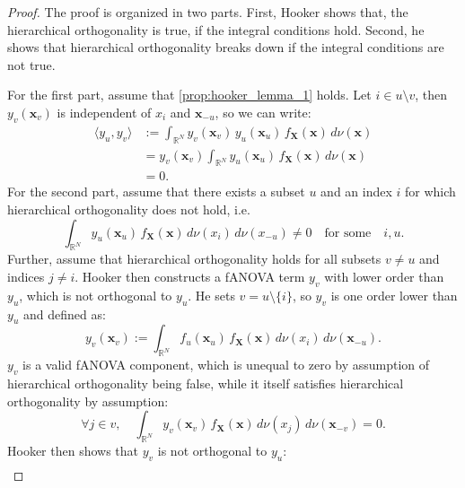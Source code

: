 \begin{proof}
    The proof is organized in two parts. First, Hooker shows that, the hierarchical orthogonality is true, if the integral conditions hold. Second, he shows that hierarchical orthogonality breaks down if the integral conditions are not true.\par
    For the first part, assume that \autoref{prop:hooker_lemma_1} holds. Let $i \in u \setminus v$, then $y_v(\boldsymbol{x}_v)$ is independent of $x_i$ and $\boldsymbol{x}_{-u}$, so we can write:
\begin{align*}
\langle y_u, y_v \rangle 
&:= \int_{\mathbb{R}^N} 
        y_v(\boldsymbol{x}_v)\, y_u(\boldsymbol{x}_u)\, 
        f_{\boldsymbol{X}}(\boldsymbol{x})\, 
        d \nu(\boldsymbol{x}) \\[0.3em]
&= y_v(\boldsymbol{x}_v) 
   \int_{\mathbb{R}^N} 
        y_u(\boldsymbol{x}_u)\, 
        f_{\boldsymbol{X}}(\boldsymbol{x})\, 
        d \nu(\boldsymbol{x}) \\[0.3em]
&= 0.
\end{align*}
For the second part, assume that there exists a subset $u$ and an index $i$ for which hierarchical orthogonality does not hold, i.e.
\begin{equation*}
    \int_{\mathbb{R}^N} y_u(\boldsymbol{x}_u)\, f_{\boldsymbol{X}}(\boldsymbol{x})\, d \nu (x_i)\, d \nu (x_{-u}) \ne 0 
    \quad \text{for some} \quad i, u.
\end{equation*}
Further, assume that hierarchical orthogonality holds for all subsets $v \neq u$ and indices $j \neq i$. 
Hooker then constructs a fANOVA term $y_v$ with lower order than $y_u$, which is not orthogonal to $y_u$. 
He sets $v = u \setminus \{i\}$, so $y_v$ is one order lower than $y_u$ and defined as:
\begin{equation*}
    y_v(\boldsymbol{x}_v) := \int_{\mathbb{R}^N} f_u(\boldsymbol{x}_u) \, f_{\boldsymbol{X}}(\boldsymbol{x}) \, d \nu (x_i) \, d \nu (\boldsymbol{x}_{-u}).
\end{equation*}
$y_v$ is a valid fANOVA component, which is unequal to zero by assumption of hierarchical orthogonality being false, while it itself satisfies hierarchical orthogonality by assumption:
\begin{equation*}
    \forall j \in v, \quad \int_{\mathbb{R}^N} y_v(\boldsymbol{x}_v) \, f_{\boldsymbol{X}}(\boldsymbol{x}) \, d \nu (x_j) \, d \nu (\boldsymbol{x}_{-v}) = 0.
\end{equation*}
Hooker then shows that $y_v$ is not orthogonal to $y_u$:
\begin{align*}

\end{align*}
\end{proof}
